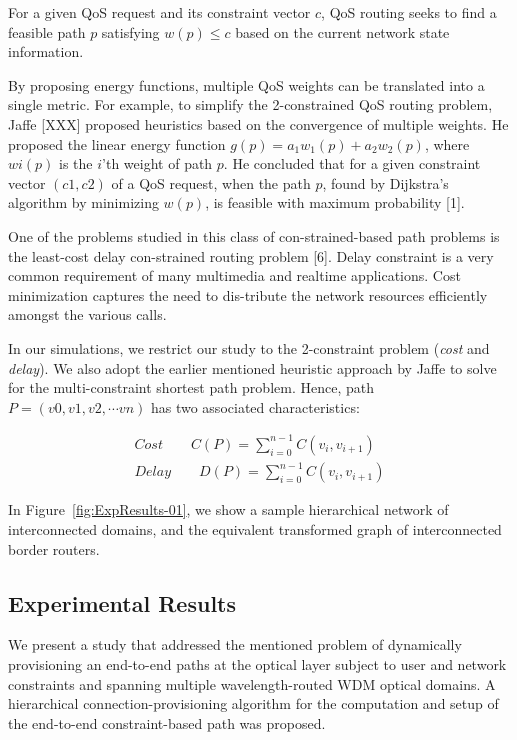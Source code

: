 For a given QoS request and its constraint vector $c$, QoS routing seeks to find a feasible path $p$ satisfying $w(p) \leq c$ based on the current network state information.

By proposing energy functions, multiple QoS weights can be translated into a single metric. For example, to simplify the 2-constrained QoS routing problem, Jaffe [XXX] proposed heuristics based on the convergence of multiple weights. He proposed the linear energy function $g(p) = a_1w_1(p)+ a_2w_2(p)$, where $wi(p)$ is the $i$'th weight of path $p$. He concluded that for a given constraint vector $(c1, c2)$ of a QoS request, when the path $p$, found by Dijkstra's algorithm by minimizing $w(p)$, is feasible with maximum probability [1].

One of the problems studied in this class of con-strained-based path problems is the least-cost delay con-strained routing problem [6]. Delay constraint is a very common requirement of many multimedia and realtime applications. Cost minimization captures the need to dis-tribute the network resources efficiently amongst the various calls.

In our simulations, we restrict our study to the 2-constraint problem (\emph{cost} and \emph{delay}). We also adopt the earlier mentioned heuristic approach by Jaffe to solve for the multi-constraint shortest path problem. Hence, path $P = (v0, v1, v2, \cdots vn)$ has two associated characteristics: 

\begin{eqnarray}
Cost \qquad C(P)=\sum_{i=0}^{n-1}C(v_i,v_{i+1}) \\
Delay \qquad D(P)=\sum_{i=0}^{n-1}C(v_i,v_{i+1})
\end{eqnarray}

In Figure~\ref{fig:ExpResults-01}, we show a sample hierarchical network of interconnected domains, and the equivalent transformed graph of interconnected border routers.

\subsection{Experimental Results}
We present a study that addressed the mentioned problem of dynamically provisioning an end-to-end paths at the optical layer subject to user and network constraints and spanning multiple wavelength-routed WDM optical domains. A hierarchical connection-provisioning algorithm for the computation and setup of the end-to-end constraint-based path was proposed.

